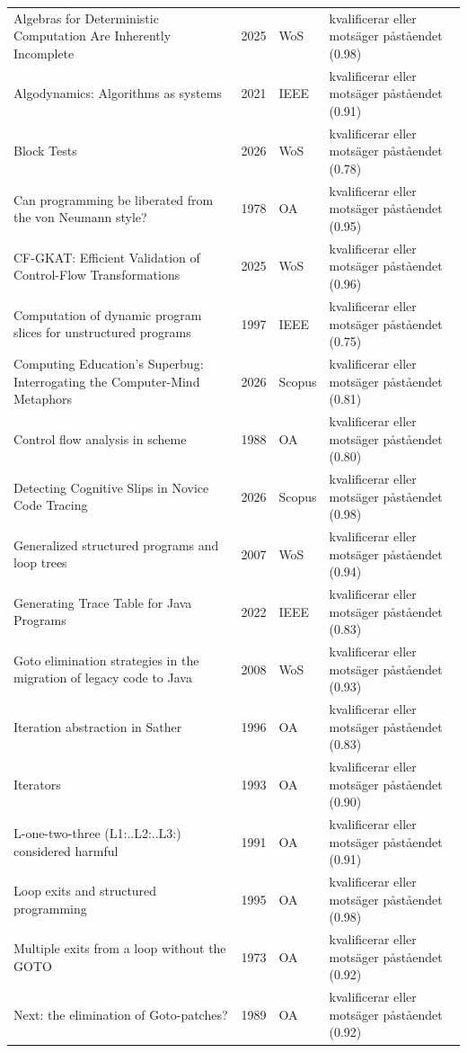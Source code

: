 \begin{longtable}{@{}%
  >{\raggedright\arraybackslash}p{}c%
  >{\raggedright\arraybackslash}p{}%
  >{\raggedright\arraybackslash}p{}@{}}
Algebras for Deterministic Computation Are Inherently Incomplete & 2025 & WoS & kvalificerar eller motsäger påståendet (0.98) \\
Algodynamics: Algorithms as systems & 2021 & IEEE & kvalificerar eller motsäger påståendet (0.91) \\
Block Tests & 2026 & WoS & kvalificerar eller motsäger påståendet (0.78) \\
Can programming be liberated from the von Neumann style? & 1978 & OA & kvalificerar eller motsäger påståendet (0.95) \\
CF-GKAT: Efficient Validation of Control-Flow Transformations & 2025 & WoS & kvalificerar eller motsäger påståendet (0.96) \\
Computation of dynamic program slices for unstructured programs & 1997 & IEEE & kvalificerar eller motsäger påståendet (0.75) \\
Computing Education's Superbug: Interrogating the Computer-Mind Metaphors & 2026 & Scopus & kvalificerar eller motsäger påståendet (0.81) \\
Control flow analysis in scheme & 1988 & OA & kvalificerar eller motsäger påståendet (0.80) \\
Detecting Cognitive Slips in Novice Code Tracing & 2026 & Scopus & kvalificerar eller motsäger påståendet (0.98) \\
Generalized structured programs and loop trees & 2007 & WoS & kvalificerar eller motsäger påståendet (0.94) \\
Generating Trace Table for Java Programs & 2022 & IEEE & kvalificerar eller motsäger påståendet (0.83) \\
Goto elimination strategies in the migration of legacy code to Java & 2008 & WoS & kvalificerar eller motsäger påståendet (0.93) \\
Iteration abstraction in Sather & 1996 & OA & kvalificerar eller motsäger påståendet (0.83) \\
Iterators & 1993 & OA & kvalificerar eller motsäger påståendet (0.90) \\
L-one-two-three (L1:..L2:..L3:) considered harmful & 1991 & OA & kvalificerar eller motsäger påståendet (0.91) \\
Loop exits and structured programming & 1995 & OA & kvalificerar eller motsäger påståendet (0.98) \\
Multiple exits from a loop without the GOTO & 1973 & OA & kvalificerar eller motsäger påståendet (0.92) \\
Next: the elimination of Goto-patches? & 1989 & OA & kvalificerar eller motsäger påståendet (0.92) \\

\end{longtable}

